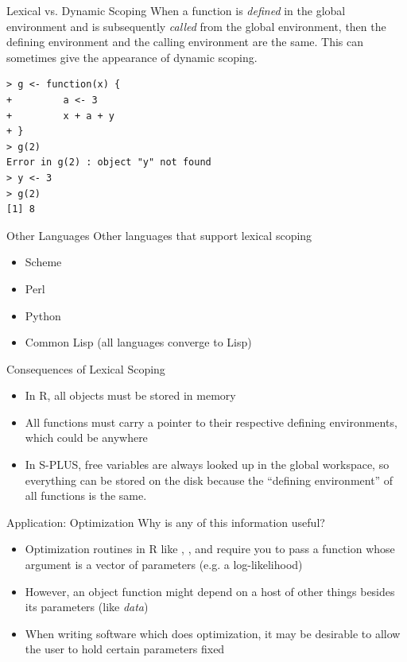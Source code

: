 \documentclass[aspectratio=169]{beamer}
\begin{document}
\begin{frame}[fragile]{Lexical vs. Dynamic Scoping}
When a function is \textit{defined} in the global environment and is
subsequently \textit{called} from the global environment, then the
defining environment and the calling environment are the same.  This
can sometimes give the appearance of dynamic scoping.
\begin{verbatim}
> g <- function(x) {
+         a <- 3
+         x + a + y
+ }
> g(2)
Error in g(2) : object "y" not found
> y <- 3
> g(2)
[1] 8
\end{verbatim}
\end{frame}


\begin{frame}{Other Languages}
Other languages that support lexical scoping
\begin{itemize}
\item
Scheme
\item
Perl
\item
Python
\item
Common Lisp (all languages converge to Lisp)
\end{itemize}
\end{frame}

\begin{frame}{Consequences of Lexical Scoping}
\begin{itemize}
\item
In R, all objects must be stored in memory
\item
All functions must carry a pointer to their respective defining
environments, which could be anywhere
\item
In S-PLUS, free variables are always looked up in the global
workspace, so everything can be stored on the disk because the
``defining environment'' of all functions is the same.
\end{itemize}
\end{frame}

\begin{frame}{Application: Optimization}
Why is any of this information useful?
\begin{itemize}
\item
Optimization routines in R like , , and
 require you to pass a function whose argument is a
vector of parameters (e.g. a log-likelihood)
\item
However, an object function might depend on a host of other things
besides its parameters (like \textit{data})
\item
When writing software which does optimization, it may be desirable to
allow the user to hold certain parameters fixed
\end{itemize}
\end{frame}
\end{document}
